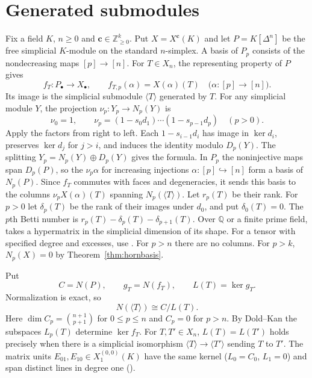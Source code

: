 \section{Generated submodules}
\label{sec:generated}
Fix a field $K$, $n\geq0$ and $\mathbf c\in\mathbb Z_{\geq0}^k$.
Put $X=X^{\mathbf c}(K)$ and let $P=K[\Delta^n]$ be the free simplicial
$K$-module on the standard $n$-simplex. A basis of $P_p$ consists of
the nondecreasing maps $[p]\to[n]$.
For $T\in X_n$, the representing property of $P$ gives
\[
 f_T:P_\bullet\longrightarrow X_\bullet,
 \qquad f_{T,p}(\alpha)=X(\alpha)(T)
 \quad\bigl(\alpha:[p]\to[n]\bigr).
\]
Its image is the simplicial submodule $\langle T\rangle$ generated by $T$.
For any simplicial module $Y$, the projection $\nu_p:Y_p\to N_p(Y)$ is
\[
 \nu_0=1,\qquad
 \nu_p=(1-s_0d_1)\cdots(1-s_{p-1}d_p)\quad(p>0).
\]
Apply the factors from right to left. Each $1-s_{i-1}d_i$ has image in
$\ker d_i$, preserves $\ker d_j$ for $j>i$, and induces the identity
modulo $D_p(Y)$. The splitting $Y_p=N_p(Y)\oplus D_p(Y)$ gives the formula.
In $P_p$ the noninjective maps span $D_p(P)$, so the $\nu_p\alpha$
for increasing injections $\alpha:[p]\hookrightarrow[n]$ form a basis of $N_p(P)$.
Since $f_T$ commutes with faces and degeneracies, it sends this basis
to the columns $\nu_p X(\alpha)(T)$ spanning $N_p(\langle T\rangle)$.
Let $r_p(T)$ be their rank. For $p>0$ let $\delta_p(T)$ be the rank of their
images under $d_0$, and put $\delta_0(T)=0$.
The $p$th Betti number is $r_p(T)-\delta_p(T)-\delta_{p+1}(T)$.
Over $\mathbb Q$ or a finite prime field,
 takes a hypermatrix in the simplicial dimension of its shape.
For a tensor with specified degree and excesses, use
.
For $p>n$ there are no columns. For $p>k$, $N_p(X)=0$ by
Theorem~\ref{thm:hornbasis}.

Put
\[
 C=N(P),\qquad g_T=N(f_T),\qquad L(T)=\ker g_T.
\]
Normalization is exact, so
\begin{equation}\label{eq:generated-normalization}
 N(\langle T\rangle)\cong C/L(T).
\end{equation}
Here $\dim C_p=\binom{n+1}{p+1}$ for $0\leq p\leq n$ and $C_p=0$ for $p>n$.
By Dold--Kan the subspaces $L_p(T)$ determine $\ker f_T$. For
$T,T'\in X_n$, $L(T)=L(T')$ holds precisely when there is a simplicial
isomorphism $\langle T\rangle\to\langle T'\rangle$ sending $T$ to $T'$.
The matrix units $E_{01},E_{10}\in X^{(0,0)}_1(K)$ have the same
kernel ($L_0=C_0$, $L_1=0$) and span distinct lines in degree one
().

